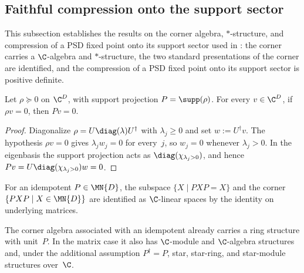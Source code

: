 \subsection{Faithful compression onto the support sector}

This subsection establishes the results on the corner algebra,
$*$-structure, and compression of a PSD fixed point onto its support sector
used in \cite[Corollary~6.6]{Wolf2012Quantum}: the corner carries a
$\C$-algebra and $*$-structure, the two standard presentations of the corner
are identified, and the compression of a PSD fixed point onto its support
sector is positive definite.

\begin{lemma}%
    \label{lem:supportProj_mulVec_eq_zero_of_mulVec_eq_zero}
    \leanok
    Let $\rho\succeq0$ on $\C^D$, with support projection
    $P=\supp(\rho)$. For every $v\in\C^D$, if $\rho v=0$, then $Pv=0$.
\end{lemma}

\begin{proof}\leanok
    Diagonalize $\rho=U\diag(\lambda)U^\dagger$ with $\lambda_j\geq0$ and
    set $w:=U^\dagger v$. The hypothesis $\rho v=0$ gives
    $\lambda_jw_j=0$ for every~$j$, so $w_j=0$ whenever $\lambda_j>0$.
    In the eigenbasis the support projection acts as
    $\diag(\chi_{\lambda_j>0})$, and hence
    $Pv=U\diag(\chi_{\lambda_j>0})w=0$.
\end{proof}

\begin{definition}%
    \label{def:cornerSubmoduleCornerEquiv}
    \leanok
    For an idempotent $P\in\MN{D}$, the subspace
    $\{X\mid PXP=X\}$ and the corner
    $\{PXP\mid X\in\MN{D}\}$ are identified as $\C$-linear spaces by the
    identity on underlying matrices.
\end{definition}

\begin{remark}%
    \label{rem:corner_algebra_star_instances}
    \leanok
    The corner algebra associated with an idempotent already carries a ring
    structure with unit~$P$. In the matrix case it also has
    $\C$-module and $\C$-algebra structures and, under the additional
    assumption $P^\dagger=P$, star, star-ring, and star-module structures
    over~$\C$.
\end{remark}


